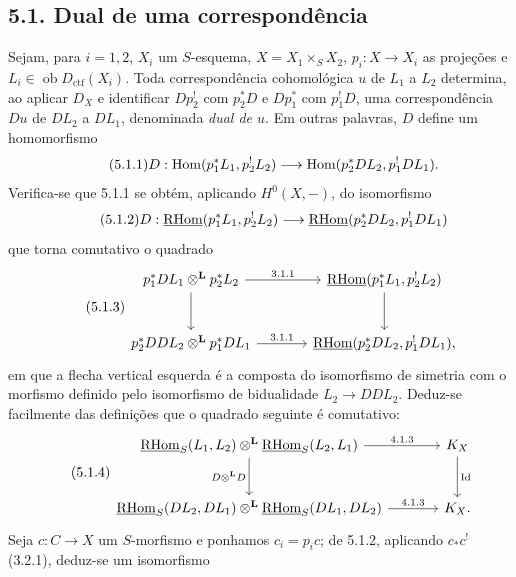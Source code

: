 \subsection*{5.1. Dual de uma correspondência}

Sejam, para $i=1,2$, $X_i$ um $S$-esquema, $X=X_1\times_S X_2$, $p_i:X\to X_i$ as projeções e $L_i\in\operatorname{ob}D_{\mathrm{ctf}}(X_i)$. Toda correspondência cohomológica $u$ de $L_1$ a $L_2$ determina, ao aplicar $D_X$ e identificar $Dp_2^!$ com $p_2^*D$ e $Dp_1^*$ com $p_1^!D$, uma correspondência $Du$ de $DL_2$ a $DL_1$, denominada \emph{dual de $u$}. Em outras palavras, $D$ define um homomorfismo
\begin{equation}
\tag{5.1.1}
D:\operatorname{Hom}(p_1^*L_1,p_2^!L_2)\longrightarrow \operatorname{Hom}(p_2^*DL_2,p_1^!DL_1).
\end{equation}
Verifica-se que 5.1.1 se obtém, aplicando $H^0(X,-)$, do isomorfismo
\begin{equation}
\tag{5.1.2}
D:\underline{\mathrm{RHom}}(p_1^*L_1,p_2^!L_2)\longrightarrow\underline{\mathrm{RHom}}(p_2^*DL_2,p_1^!DL_1)
\end{equation}
que torna comutativo o quadrado
\begin{equation}
\tag{5.1.3}
\begin{tikzcd}[column sep=large,row sep=large]
p_1^*DL_1\otimes^{\mathbf L}p_2^*L_2 \arrow[r,"3.1.1"] \arrow[d]
& \uRHom(p_1^*L_1,p_2^!L_2) \arrow[d] \\
p_2^*DDL_2\otimes^{\mathbf L}p_1^*DL_1 \arrow[r,"3.1.1"]
& \uRHom(p_2^*DL_2,p_1^!DL_1),
\end{tikzcd}
\end{equation}
em que a flecha vertical esquerda é a composta do isomorfismo de simetria com o morfismo definido pelo isomorfismo de bidualidade $L_2\to DDL_2$. Deduz-se facilmente das definições que o quadrado seguinte é comutativo:
\begin{equation}
\tag{5.1.4}
\begin{tikzcd}[column sep=large,row sep=large]
\uRHom_S(L_1,L_2)\otimes^{\mathbf L}\uRHom_S(L_2,L_1) \arrow[r,"4.1.3"] \arrow[d,"D\otimes^{\mathbf L} D"']
& K_X \arrow[d,"\operatorname{Id}"] \\
\uRHom_S(DL_2,DL_1)\otimes^{\mathbf L}\uRHom_S(DL_1,DL_2) \arrow[r,"4.1.3"]
& K_X.
\end{tikzcd}
\end{equation}
Seja $c:C\to X$ um $S$-morfismo e ponhamos $c_i=p_ic$; de 5.1.2, aplicando $c_*c^!$ (3.2.1), deduz-se um isomorfismo
